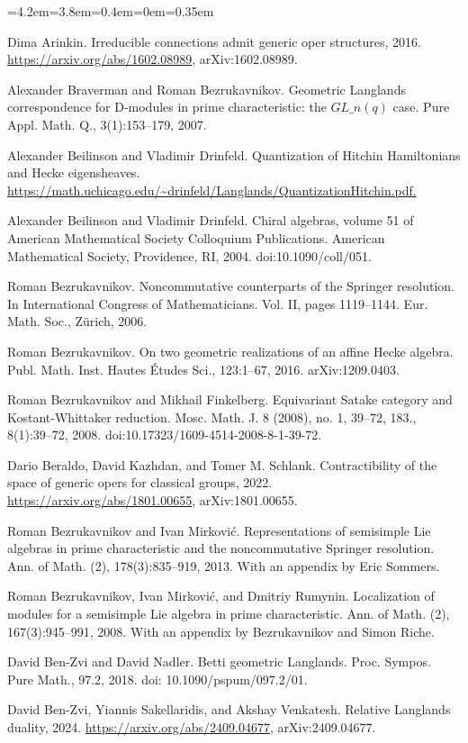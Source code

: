 \begin{list}{}{\leftmargin=4.2em=3.8em=0.4em\itemindent=0em\parsep=0.35em}
\item[{Ari16}] Dima Arinkin. Irreducible connections admit generic oper structures, 2016. \url{https://arxiv.org/abs/1602.08989}, arXiv:1602.08989.
\item[{BB07}] Alexander Braverman and Roman Bezrukavnikov. Geometric Langlands correspondence for D-modules in prime characteristic: the $GL\_n(q)$ case. Pure Appl. Math. Q., 3(1):153–179, 2007.
\item[{BD}] Alexander Beilinson and Vladimir Drinfeld. Quantization of Hitchin Hamiltonians and Hecke eigensheaves. \url{https://math.uchicago.edu/~drinfeld/Langlands/QuantizationHitchin.pdf.}
\item[{BD04}] Alexander Beilinson and Vladimir Drinfeld. Chiral algebras, volume 51 of American Mathematical Society Colloquium Publications. American Mathematical Society, Providence, RI, 2004. doi:10.1090/coll/051.
\item[{Bez06}] Roman Bezrukavnikov. Noncommutative counterparts of the Springer resolution. In International Congress of Mathematicians. Vol. II, pages 1119–1144. Eur. Math. Soc., Zürich, 2006.
\item[{Bez16}] Roman Bezrukavnikov. On two geometric realizations of an affine Hecke algebra. Publ. Math. Inst. Hautes Études Sci., 123:1–67, 2016. arXiv:1209.0403.
\item[{BF08}] Roman Bezrukavnikov and Mikhail Finkelberg. Equivariant Satake category and Kostant-Whittaker reduction. Mosc. Math. J. 8 (2008), no. 1, 39–72, 183., 8(1):39–72, 2008. doi:10.17323/1609-4514-2008-8-1-39-72.
\item[{BKS22}] Dario Beraldo, David Kazhdan, and Tomer M. Schlank. Contractibility of the space of generic opers for classical groups, 2022. \url{https://arxiv.org/abs/1801.00655}, arXiv:1801.00655.
\item[{BM13}] Roman Bezrukavnikov and Ivan Mirković. Representations of semisimple Lie algebras in prime characteristic and the noncommutative Springer resolution. Ann. of Math. (2), 178(3):835–919, 2013. With an appendix by Eric Sommers.
\item[{BMR08}] Roman Bezrukavnikov, Ivan Mirković, and Dmitriy Rumynin. Localization of modules for a semisimple Lie algebra in prime characteristic. Ann. of Math. (2), 167(3):945–991, 2008. With an appendix by Bezrukavnikov and Simon Riche.
\item[{BZN18}] David Ben-Zvi and David Nadler. Betti geometric Langlands. Proc. Sympos. Pure Math., 97.2, 2018. doi: 10.1090/pspum/097.2/01.
\item[{BZSV24}] David Ben-Zvi, Yiannis Sakellaridis, and Akshay Venkatesh. Relative Langlands duality, 2024. \url{https://arxiv.org/abs/2409.04677}, arXiv:2409.04677.

\end{list}
